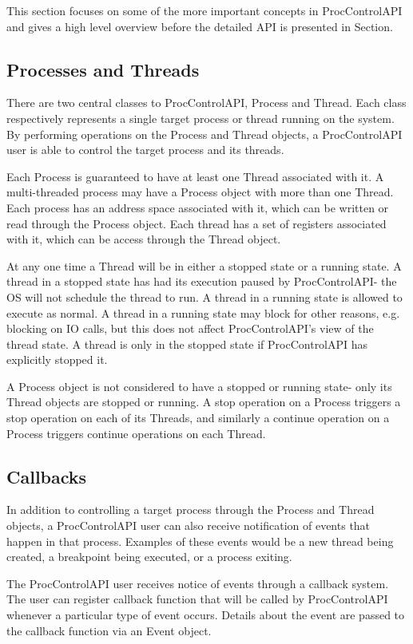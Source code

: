 This section focuses on some of the more important concepts in ProcControlAPI
and gives a high level overview before the detailed API is presented in Section.

\subsection{Processes and Threads}
There are two central classes to ProcControlAPI, Process and Thread.
Each class respectively represents a single
target process or thread running on the system. By performing operations on
the Process and Thread objects, a ProcControlAPI user is able to control the
target process and its threads.

Each Process is guaranteed to have at least one Thread associated with it. A
multi-threaded process may have a Process object with more than one Thread.
Each process has an address space associated with it, which can be written or
read through the Process object. Each thread has a set of registers
associated with it, which can be access through the Thread object.

At any one time a Thread will be in either a stopped state or a running
state. A thread in a
stopped state has had its execution paused by
ProcControlAPI- the OS will not schedule the thread to run.
A thread in a running state is allowed to execute as normal. A thread in a
running state may block for other reasons, e.g. blocking on IO calls, but this
does not affect ProcControlAPI's view of the thread state.
A thread is only in the stopped state if ProcControlAPI has explicitly
stopped it.

A Process object is not considered to have a stopped or running
state- only its Thread objects are stopped or running. A
stop operation on a Process triggers a stop operation on each of its Threads,
and similarly a continue operation on a Process triggers continue operations on
each Thread.

\subsection{Callbacks}
In addition to controlling a target process through the Process and Thread
objects, a ProcControlAPI user can also receive notification of events that
happen in that process. Examples of these events would be a new thread being
created, a breakpoint being executed, or a process exiting.

The ProcControlAPI user receives notice of events through a callback system.
The user can register callback function that will be called by ProcControlAPI
whenever a particular type of event occurs. Details about the event are
passed to the callback function via an Event object.

